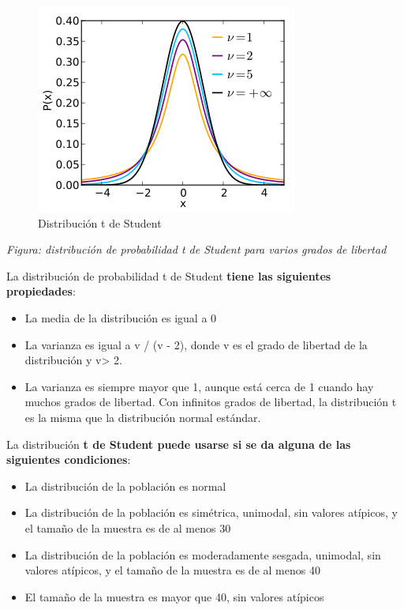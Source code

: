 \documentclass[11pt]{article}
\makeatletter
\def\maxwidth{\ifdim\Gin@nat@width>\linewidth\linewidth
    \else\Gin@nat@width\fi}
\let\Oldincludegraphics\includegraphics
\renewcommand{\includegraphics}[1]{\Oldincludegraphics[width=.8\maxwidth]{#1}}
\providecommand{\tightlist}{%
      \setlength{\itemsep}{0pt}\setlength{\parskip}{0pt}}
\makeatother
\begin{document}
\begin{figure}
\centering
\includegraphics{student_t_pdf.png}
\caption{Distribución t de Student}
\end{figure}

\emph{Figura: distribución de probabilidad t de Student para varios
grados de libertad}

La distribución de probabilidad t de Student \textbf{tiene las
siguientes propiedades}:

\begin{itemize}
\tightlist
\item
  La media de la distribución es igual a 0
\item
  La varianza es igual a v / (v - 2), donde v es el grado de libertad de
  la distribución y v\textgreater{} 2.
\item
  La varianza es siempre mayor que 1, aunque está cerca de 1 cuando hay
  muchos grados de libertad. Con infinitos grados de libertad, la
  distribución t es la misma que la distribución normal estándar.
\end{itemize}

La distribución \textbf{t de Student puede usarse si se da alguna de las
siguientes condiciones}:

\begin{itemize}
\tightlist
\item
  La distribución de la población es normal
\item
  La distribución de la población es simétrica, unimodal, sin valores
  atípicos, y el tamaño de la muestra es de al menos 30
\item
  La distribución de la población es moderadamente sesgada, unimodal,
  sin valores atípicos, y el tamaño de la muestra es de al menos 40
\item
  El tamaño de la muestra es mayor que 40, sin valores atípicos
\end{itemize}
\end{document}
